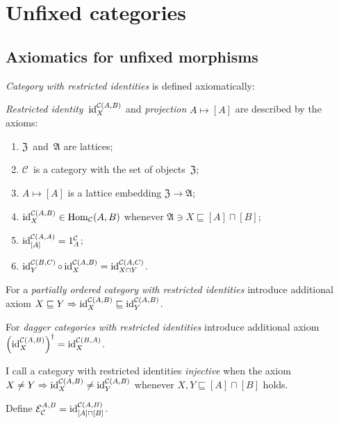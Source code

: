 \chapter{Unfixed categories}

\section{Axiomatics for unfixed morphisms}

\begin{defn}
\emph{Category with restricted identities} is defined
axiomatically:

\emph{Restricted identity}~$\operatorname{id}^{\mathcal{C}(A,B)}_X$
and \emph{projection} $A\mapsto[A]$ are
described by the axioms:
\begin{enumerate}
\item $\mathfrak{Z}$~and~$\mathfrak{A}$ are lattices;
\item $\mathcal{C}$~is a category with the set of
objects~$\mathfrak{Z}$;
\item $A\mapsto[A]$ is a lattice embedding
$\mathfrak{Z}\to\mathfrak{A}$;
\item $\operatorname{id}^{\mathcal{C}(A,B)}_X\in\operatorname{Hom}_{\mathcal{C}}(A,B)$
whenever $\mathfrak{A}\ni X\sqsubseteq [A]\sqcap[B]$;
\item $\operatorname{id}^{\mathcal{C}(A,A)}_{[A]} = 1^{\mathcal{C}}_A$;
\item $\operatorname{id}^{\mathcal{C}(B,C)}_Y \circ \operatorname{id}^{\mathcal{C}(A,B)}_X = \operatorname{id}^{\mathcal{C}(A,C)}_{X\sqcap Y}$.
\end{enumerate}

For a \emph{partially ordered category with restricted identities} introduce additional axiom $X\sqsubseteq Y\Rightarrow
\operatorname{id}^{\mathcal{C}(A,B)}_X\sqsubseteq\operatorname{id}^{\mathcal{C}(A,B)}_Y$.

For \emph{dagger categories with restricted identities} introduce additional axiom
$\left(\operatorname{id}^{\mathcal{C}(A,B)}_X\right)^\dagger =
\operatorname{id}^{\mathcal{C}(B,A)}_X$.
\end{defn}

\begin{defn}
I call a category with restricted identities
\emph{injective} when the axiom $X\ne Y\Rightarrow
\operatorname{id}^{\mathcal{C}(A,B)}_X\ne\operatorname{id}^{\mathcal{C}(A,B)}_Y$
whenever $X,Y\sqsubseteq[A]\sqcap[B]$ holds.
\end{defn}

\begin{defn}
Define $\mathcal{E}_{\mathcal{C}}^{A,B} =
\operatorname{id}^{\mathcal{C}(A,B)}_{[A]\sqcap[B]}$.
\end{defn}

